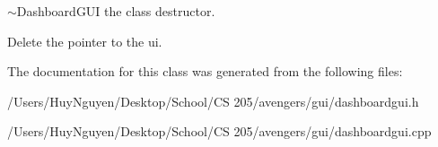$\sim$\+Dashboard\+G\+UI the class destructor. 

Delete the pointer to the ui. 

The documentation for this class was generated from the following files\+:\begin{DoxyCompactItemize}
\item 
/\+Users/\+Huy\+Nguyen/\+Desktop/\+School/\+C\+S 205/avengers/gui/dashboardgui.\+h\item 
/\+Users/\+Huy\+Nguyen/\+Desktop/\+School/\+C\+S 205/avengers/gui/dashboardgui.\+cpp\end{DoxyCompactItemize}
